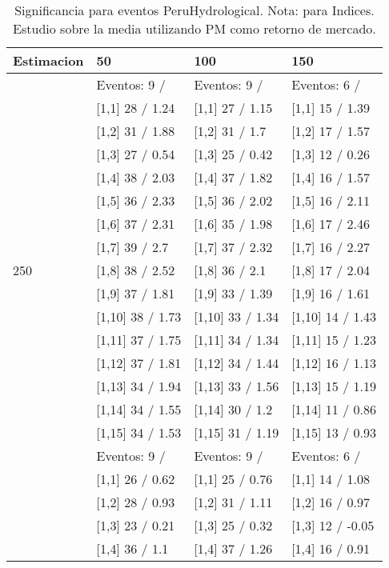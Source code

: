 \begin{table}

\caption{Significancia para eventos PeruHydrological. Nota: para Indices. Estudio sobre la media utilizando PM como retorno de mercado.}
\centering
\begin{tabular}[t]{llll}
\toprule
Estimacion & 50 & 100 & 150\\
\midrule
 & Eventos:  9 / & Eventos:  9 / & Eventos:  6 /\\
 & {}[1,1] 28  / 1.24 & {}[1,1] 27  / 1.15 & {}[1,1] 15  / 1.39\\
 & {}[1,2] 31  / 1.88 & {}[1,2] 31  / 1.7 & {}[1,2] 17  / 1.57\\
 & {}[1,3] 27  / 0.54 & {}[1,3] 25  / 0.42 & {}[1,3] 12  / 0.26\\
 & {}[1,4] 38  / 2.03 & {}[1,4] 37  / 1.82 & {}[1,4] 16  / 1.57\\
\addlinespace
 & {}[1,5] 36  / 2.33 & {}[1,5] 36  / 2.02 & {}[1,5] 16  / 2.11\\
 & {}[1,6] 37  / 2.31 & {}[1,6] 35  / 1.98 & {}[1,6] 17  / 2.46\\
 & {}[1,7] 39  / 2.7 & {}[1,7] 37  / 2.32 & {}[1,7] 16  / 2.27\\
250 & {}[1,8] 38  / 2.52 & {}[1,8] 36  / 2.1 & {}[1,8] 17  / 2.04\\
 & {}[1,9] 37  / 1.81 & {}[1,9] 33  / 1.39 & {}[1,9] 16  / 1.61\\
\addlinespace
 & {}[1,10] 38  / 1.73 & {}[1,10] 33  / 1.34 & {}[1,10] 14  / 1.43\\
 & {}[1,11] 37  / 1.75 & {}[1,11] 34  / 1.34 & {}[1,11] 15  / 1.23\\
 & {}[1,12] 37  / 1.81 & {}[1,12] 34  / 1.44 & {}[1,12] 16  / 1.13\\
 & {}[1,13] 34  / 1.94 & {}[1,13] 33  / 1.56 & {}[1,13] 15  / 1.19\\
 & {}[1,14] 34  / 1.55 & {}[1,14] 30  / 1.2 & {}[1,14] 11  / 0.86\\
\addlinespace
 & {}[1,15] 34  / 1.53 & {}[1,15] 31  / 1.19 & {}[1,15] 13  / 0.93\\
 & Eventos:  9 / & Eventos:  9 / & Eventos:  6 /\\
 & {}[1,1] 26  / 0.62 & {}[1,1] 25  / 0.76 & {}[1,1] 14  / 1.08\\
 & {}[1,2] 28  / 0.93 & {}[1,2] 31  / 1.11 & {}[1,2] 16  / 0.97\\
 & {}[1,3] 23  / 0.21 & {}[1,3] 25  / 0.32 & {}[1,3] 12  / -0.05\\
\addlinespace
 & {}[1,4] 36  / 1.1 & {}[1,4] 37  / 1.26 & {}[1,4] 16  / 0.91\\

\end{tabular}
\end{table}
